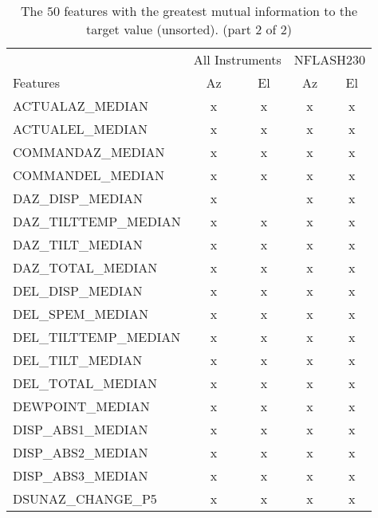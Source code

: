 \begin{table}
    \centering
    \caption{The $50$ features with the greatest mutual information to the target value (unsorted). (part 2 of 2)}
    \begin{tabular}{lcccc}
        \toprule
        & \multicolumn{2}{c}{All Instruments} & \multicolumn{2}{c}{NFLASH230}\\
        \cmidrule(lr){2-3} \cmidrule(lr){4-5}
        Features & Az & El & Az & El \\  \hline
        ACTUALAZ\_MEDIAN       &      x &      x &      x &      x   \\ \hline
        ACTUALEL\_MEDIAN       &      x &      x &      x &      x   \\ \hline
        COMMANDAZ\_MEDIAN       &      x &      x &      x &      x  \\ \hline
        COMMANDEL\_MEDIAN       &      x &      x &      x &      x  \\ \hline
        DAZ\_DISP\_MEDIAN       &      x &        &      x &      x  \\ \hline
        DAZ\_TILTTEMP\_MEDIAN &      x &      x &      x &      x   \\ \hline
        DAZ\_TILT\_MEDIAN      &      x &      x &      x &      x   \\ \hline
        DAZ\_TOTAL\_MEDIAN      &      x &      x &      x &      x  \\ \hline
        DEL\_DISP\_MEDIAN      &      x &      x &      x &      x   \\ \hline
        DEL\_SPEM\_MEDIAN     &      x &      x &      x &      x   \\ \hline
        DEL\_TILTTEMP\_MEDIAN &      x &      x &      x &      x   \\ \hline
        DEL\_TILT\_MEDIAN     &      x &      x &      x &      x   \\ \hline
        DEL\_TOTAL\_MEDIAN    &      x &      x &      x &      x   \\ \hline
        DEWPOINT\_MEDIAN       &      x &      x &      x &      x   \\ \hline
        DISP\_ABS1\_MEDIAN    &      x &      x &      x &      x  \\ \hline
        DISP\_ABS2\_MEDIAN    &      x &      x &      x &      x  \\ \hline
        DISP\_ABS3\_MEDIAN    &      x &      x &      x &      x  \\ \hline
        DSUNAZ\_CHANGE\_P5    &      x &      x &      x &      x  \\ \hline

\end{tabular}
\end{table}

